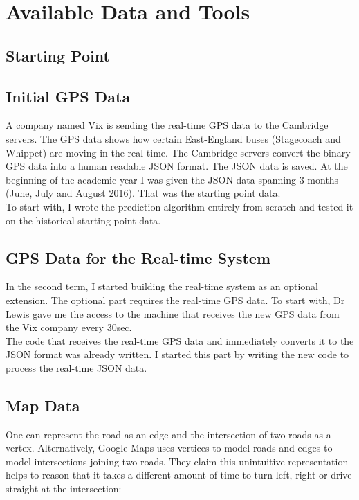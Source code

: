 \documentclass[12pt,a4paper,oneside,openright]{report}
\begin{document}
\section{Available Data and Tools}

\subsection{Starting Point}

\subsection*{Initial GPS Data}
A company named Vix is sending the real-time GPS data to the Cambridge servers. The GPS
data shows how certain East-England buses (Stagecoach and Whippet) are moving 
in the real-time. The Cambridge servers convert the binary GPS data into a human readable
JSON format. The JSON data is saved. At the beginning of the academic year I was given the
JSON data spanning 3 months (June, July and August 2016).
That was the starting point data. \\

To start with, I wrote the prediction algorithm entirely from scratch and tested it on the historical
starting point data.

\subsection*{GPS Data for the Real-time System}
In the second term, I started building the real-time system as an optional extension.
The optional part requires the real-time GPS data. To start with, Dr Lewis gave me
the access to the machine that receives the new GPS data from the Vix company every 30sec. \\

The code that receives the real-time GPS data and immediately converts it to the JSON format
was already written. I started this part by writing the new code to process the real-time JSON data.

\subsection{Map Data}

One can represent the road as an edge and the intersection of two roads as a vertex.
Alternatively, Google Maps uses vertices to model roads and edges to model intersections
joining two roads. They claim this unintuitive representation helps to reason that
it takes a different amount of time to turn left, right or drive straight at the intersection: \\
\end{document}
